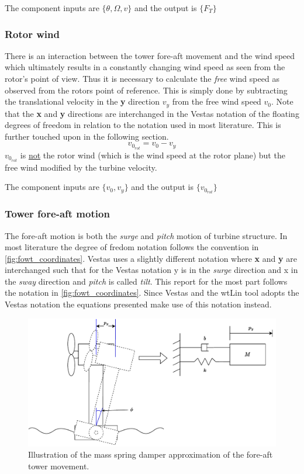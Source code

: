 The component inputs are $ \{\theta, \Omega, v \} $ and the output is $ \{F_T\} $


\subsubsection{Rotor wind} \label{sec:comp_rot_wind}
There is an interaction between the tower fore-aft movement and the wind speed which ultimately results in a constantly changing wind speed as seen from the rotor's point of view. Thus it is necessary to calculate the \textit{free} wind speed as observed from the rotors point of reference. This is simply done by subtracting the translational velocity in the  \textbf{y} direction $ v_y $ from the free wind speed $ v_0 $. Note that the \textbf{x} and \textbf{y} directions are interchanged in the Vestas notation of the floating degrees of freedom in relation to the notation used in most literature. This is further touched upon in the following section. 
\begin{equation}\label{eq:comp_rotorwind}
	v_{0_{rot}} = v_{0} - v_y
\end{equation}
$ v_{0_{rot}} $ is \underline{not} the rotor wind (which is the wind speed at the rotor plane) but the free wind modified by the turbine velocity.

The component inputs are $ \{v_0, v_y\} $ and the output is $ \{v_{0_{rot}}\} $


\subsubsection{Tower fore-aft motion} \label{sec:comp_foreaft_mod}
The fore-aft motion is both the \textit{surge} and \textit{pitch} motion of turbine structure. In most literature the degree of fredom notation follows the convention in \cref{fig:fowt_coordinates}. Vestas uses a slightly different notation where \textbf{x} and \textbf{y} are interchanged such that for the Vestas notation y is in the \textit{surge} direction and x in the \textit{sway} direction and \textit{pitch} is called \textit{tilt}. This report for the most part follows the notation in \cref{fig:fowt_coordinates}. Since Vestas and the wtLin tool adopts the Vestas notation the equations presented make use of this notation instead.
\begin{figure}[ht]
	\centering
	\includegraphics[width=0.9\linewidth]{Graphics/wtLinForeAftMotionModel.pdf}
	\caption{Illustration of the mass spring damper approximation of the fore-aft tower movement.}
	\label{fig:wtLin_fore-aft_diagram}
\end{figure}

